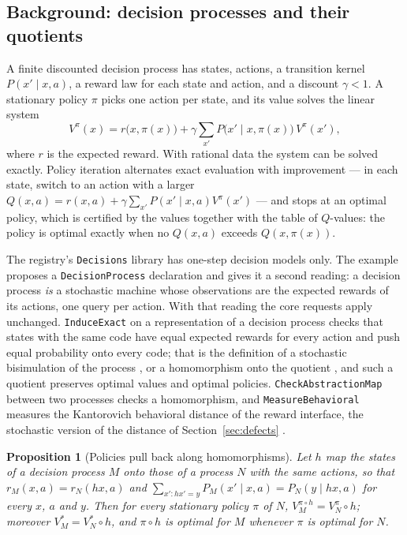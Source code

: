 \documentclass[11pt]{article}
\newcommand{\code}[1]{\texttt{#1}}
\theoremstyle{definition}
\theoremstyle{plain}
\newtheorem{proposition}[definition]{Proposition}
\begin{document}
\subsection{Background: decision processes and their quotients}

A finite discounted decision process has states, actions, a transition kernel $P(x'\mid x,a)$, a
reward law for each state and action, and a discount $\gamma<1$. A stationary policy $\pi$ picks one
action per state, and its value solves the linear system
\[
V^\pi(x)=r\bigl(x,\pi(x)\bigr)+\gamma\sum_{x'}P\bigl(x'\mid x,\pi(x)\bigr)\,V^\pi(x'),
\]
where $r$ is the expected reward. With rational data the system can be solved exactly. Policy
iteration \cite{howardpi} alternates exact evaluation with improvement --- in each state, switch to an
action with a larger $Q(x,a)=r(x,a)+\gamma\sum_{x'}P(x'\mid x,a)V^\pi(x')$ --- and stops at an optimal
policy, which is certified by the values together with the table of $Q$-values: the policy is optimal
exactly when no $Q(x,a)$ exceeds $Q(x,\pi(x))$.

The registry's \code{Decisions} library has one-step decision models only. The example proposes a
\code{DecisionProcess} declaration and gives it a second reading: a decision process \emph{is} a
stochastic machine whose observations are the expected rewards of its actions, one query per action.
With that reading the core requests apply unchanged. \code{InduceExact} on a representation of a
decision process checks that states with the same code have equal expected rewards for every action
and push equal probability onto every code; that is the definition of a stochastic bisimulation of
the process \cite{givan}, or a homomorphism onto the quotient \cite{ravindran}, and such a quotient
preserves optimal values and optimal policies. \code{CheckAbstractionMap} between two processes
checks a homomorphism, and \code{MeasureBehavioral} measures the Kantorovich behavioral distance of
the reward interface, the stochastic version of the distance of Section~\ref{sec:defects}
\cite{desharnais,vbw,ferns}.

\begin{proposition}[Policies pull back along homomorphisms]\label{prop:pullback}
Let $h$ map the states of a decision process $M$ onto those of a process $N$ with the same actions,
so that $r_M(x,a)=r_N(hx,a)$ and $\sum_{x':hx'=y}P_M(x'\mid x,a)=P_N(y\mid hx,a)$ for every $x$, $a$ and
$y$. Then for every stationary policy $\pi$ of $N$, $V_M^{\pi\circ h}=V_N^\pi\circ h$; moreover
$V_M^*=V_N^*\circ h$, and $\pi\circ h$ is optimal for $M$ whenever $\pi$ is optimal for $N$.
\end{proposition}
\end{document}
